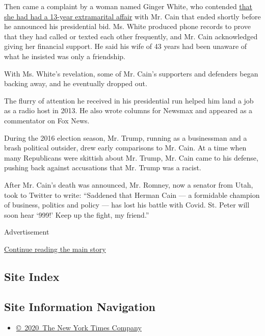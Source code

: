 Then came a complaint by a woman named Ginger White, who contended
\href{https://www.nytimes3xbfgragh.onion/2011/11/29/us/politics/cain-accused-of-affair-by-ginger-white.html}{that
she had had a 13-year extramarital affair} with Mr. Cain that ended
shortly before he announced his presidential bid. Ms. White produced
phone records to prove that they had called or texted each other
frequently, and Mr. Cain acknowledged giving her financial support. He
said his wife of 43 years had been unaware of what he insisted was only
a friendship.

With Ms. White's revelation, some of Mr. Cain's supporters and defenders
began backing away, and he eventually dropped out.

The flurry of attention he received in his presidential run helped him
land a job as a radio host in 2013. He also wrote columns for Newsmax
and appeared as a commentator on Fox News.

During the 2016 election season, Mr. Trump, running as a businessman and
a brash political outsider, drew early comparisons to Mr. Cain. At a
time when many Republicans were skittish about Mr. Trump, Mr. Cain came
to his defense, pushing back against accusations that Mr. Trump was a
racist.

After Mr. Cain's death was announced, Mr. Romney, now a senator from
Utah, took to Twitter to write: ``Saddened that Herman Cain --- a
formidable champion of business, politics and policy --- has lost his
battle with Covid. St. Peter will soon hear `999!' Keep up the fight, my
friend.''

Advertisement

\protect\hyperlink{after-bottom}{Continue reading the main story}

\hypertarget{site-index}{%
\subsection{Site Index}\label{site-index}}

\hypertarget{site-information-navigation}{%
\subsection{Site Information
Navigation}\label{site-information-navigation}}

\begin{itemize}
\tightlist
\item
  \href{https://help.nytimes3xbfgragh.onion/hc/en-us/articles/115014792127-Copyright-notice}{©~2020~The
  New York Times Company}
\end{itemize}

